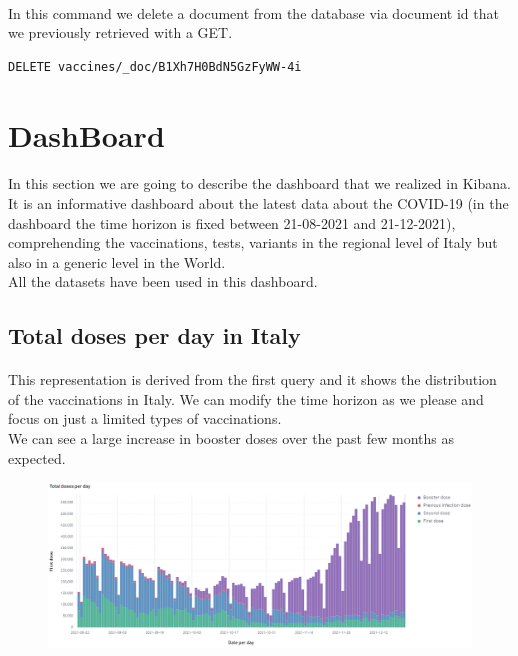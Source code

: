 \documentclass[a4paper,12pt]{article}
\begin{document}
\paragraph{} In this command we delete a document from the database via document \textunderscore id that we previously retrieved with a GET.
\begin{tcolorbox}[colback=orange!5!white,colframe=orange!75!black,title=COMMAND]
\begin{verbatim}
DELETE vaccines/_doc/B1Xh7H0BdN5GzFyWW-4i
\end{verbatim}
\end{tcolorbox}

\clearpage
\section{DashBoard}
\paragraph{} In this section we are going to describe the dashboard that we realized in Kibana.
It is an informative dashboard about the latest data about the COVID-19 (in the dashboard the time horizon is fixed between 21-08-2021 and 21-12-2021), comprehending the vaccinations, tests, variants in the regional level of Italy but also in a generic level in the World.\\
All the datasets have been used in this dashboard.
\subsection{Total doses per day in Italy}

\paragraph{}This representation is derived from the first query and it shows the distribution of the vaccinations in Italy.
We can modify the time horizon as we please and focus on just a limited types of vaccinations.\\
We can see a large increase in booster doses over the past few months as expected.
\begin{figure}[h]
	\centering
  \includegraphics[width=\linewidth]{dashboards/dash1.png}
\end{figure}
\clearpage
\end{document}
